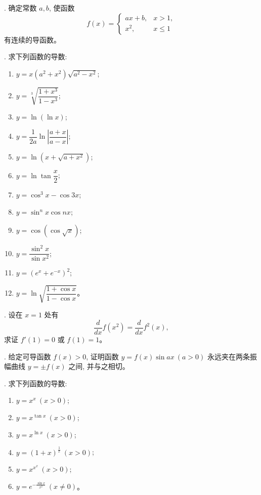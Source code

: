 \documentclass[UTF8, 12pt, fontset=fandol, oneside]{ctexart}
\begin{document}
. 确定常数 $a,b$, 使函数
\[
  f(x)=
  \begin{cases}
    ax+b, & x>1,\\
    x^2, & x\leqslant1
  \end{cases}
\]
有连续的导函数。

. 求下列函数的导数:
\begin{enumerate}
  \item $y=x(a^2+x^2)\sqrt{a^2-x^2}$;
  \item $y=\sqrt[3]{\dfrac{1+x^3}{1-x^3}}$;
  \item $y=\ln(\ln x)$;
  \item $y=\dfrac1{2a}\ln\left|\dfrac{a+x}{a-x}\right|$;
  \item $y=\ln(x+\sqrt{a+x^2})$;
  \item $y=\ln\tan\dfrac x2$;
  \item $y=\cos^3x-\cos3x$;
  \item $y=\sin^nx\cos nx$;
  \item $y=\cos(\cos\sqrt{x})$;
  \item $y=\dfrac{\sin^2x}{\sin x^2}$;
  \item $y=(e^x+e^{-x})^2$;
  \item $y=\ln\sqrt{\dfrac{1+\cos x}{1-\cos x}}$。
\end{enumerate}

. 设在 $x=1$ 处有
\[
  \frac{d}{dx}f(x^2)=\frac{d}{dx}f^2(x),
\]
求证 $f'(1)=0$ 或 $f(1)=1$。

. 给定可导函数 $f(x)>0$, 证明函数 $y=f(x)\sin ax\ (a>0)$ 永远夹在两条振幅曲线 $y=\pm f(x)$ 之间, 并与之相切。

. 求下列函数的导数:
\begin{enumerate}
  \item $y=x^x\ (x>0)$;
  \item $y=x^{\tan x}\ (x>0)$;
  \item $y=x^{\ln x}\ (x>0)$;
  \item $y=(1+x)^{\frac1x}\ (x>0)$;
  \item $y=x^{x^x}\ (x>0)$;
  \item $y=e^{-\frac{\sin x}{x^2}}\ (x\ne0)$。
\end{enumerate}
\end{document}

